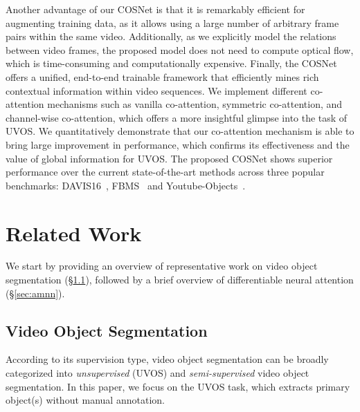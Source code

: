 \documentclass[10pt,twocolumn,letterpaper]{article}
\begin{document}
Another advantage of our COSNet is that it is remarkably efficient for augmenting training data, as it allows using a large number of arbitrary frame pairs within the same video. Additionally, as we explicitly model the relations between video frames, the proposed model does not need to compute optical flow, which is time-consuming and computationally expensive. Finally, the COSNet offers a unified, end-to-end trainable framework that efficiently mines rich contextual information within video sequences. We implement different co-attention mechanisms such as vanilla co-attention, symmetric co-attention, and channel-wise co-attention, which offers a more insightful glimpse into the task of UVOS. We quantitatively demonstrate that our co-attention mechanism is able to bring large improvement in performance, which confirms its effectiveness and the value of global information for UVOS. The proposed COSNet shows superior performance over the current state-of-the-art methods across three popular benchmarks: DAVIS16~\cite{perazzi2016benchmark}, FBMS~\cite{DBLP:journals/pami/OchsMB14} and Youtube-Objects~\cite{DBLP:conf/cvpr/PrestLCSF12}. 





\section{Related Work}
We start by providing an overview of representative work on video object segmentation (\S\ref{sec:vos}), followed by a brief overview of differentiable neural attention (\S\ref{sec:amnn}).


\subsection{Video Object Segmentation}\label{sec:vos}
According to its supervision type, video object segmentation can be broadly categorized into \textit{unsupervised} (UVOS) and \textit{semi-supervised} video object segmentation. In this paper, we focus on the UVOS task, which extracts primary object(s) without manual annotation.
\end{document}

